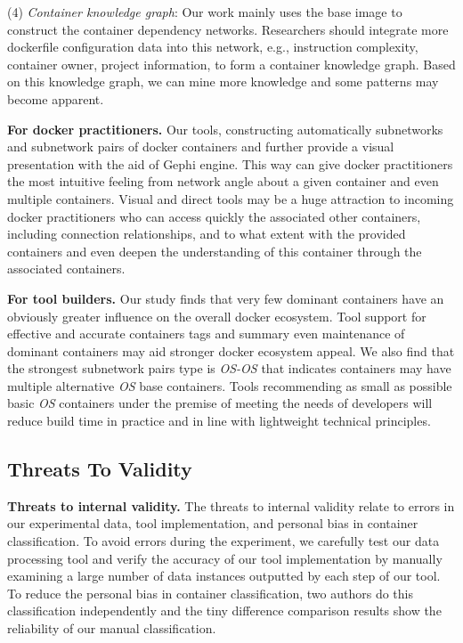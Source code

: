 \documentclass[sigconf]{acmart}
\begin{document}
(4) \noindent\emph{Container knowledge graph}: Our work mainly uses the base image to construct the container dependency networks. Researchers should integrate more dockerfile configuration data into this network, e.g., instruction complexity, container owner, project information, to form a container knowledge graph. Based on this knowledge graph, we can mine more knowledge and some patterns may become apparent. 



\smallskip
\noindent\textbf{For docker practitioners.} 
Our tools, constructing automatically subnetworks and subnetwork pairs of docker containers and further provide a visual presentation with the aid of Gephi engine. This way can give docker practitioners the most intuitive feeling from network angle about a given container and even multiple containers. Visual and direct tools may be a huge attraction to incoming docker practitioners who can access quickly the associated other containers, including connection relationships, and to what extent with the provided containers and even deepen the understanding of this container through the associated containers.     



\smallskip
\noindent\textbf{For tool builders.}
Our study finds that very few dominant containers have an obviously greater influence on the overall docker ecosystem. Tool support for effective and accurate containers tags and summary even maintenance of dominant containers may aid stronger docker ecosystem appeal. 
We also find that the strongest subnetwork pairs type is \emph{OS-OS} that indicates containers may have multiple alternative \emph{OS} base containers. Tools recommending as small as possible basic \emph{OS} containers under the premise of meeting the needs of developers will reduce build time in practice and in line with lightweight technical principles.  






\subsection{Threats To Validity}
\noindent\textbf{Threats to internal validity. }The threats to internal validity relate to errors in our experimental data, tool implementation, and personal bias in container classification. 
To avoid errors during the experiment, we carefully test our data processing tool and verify the accuracy of our tool implementation by manually examining a large number of data instances outputted by each step of our tool. To reduce the personal bias in container classification, two authors do this classification independently and the tiny difference comparison results show the reliability of our manual classification.    
\end{document}
